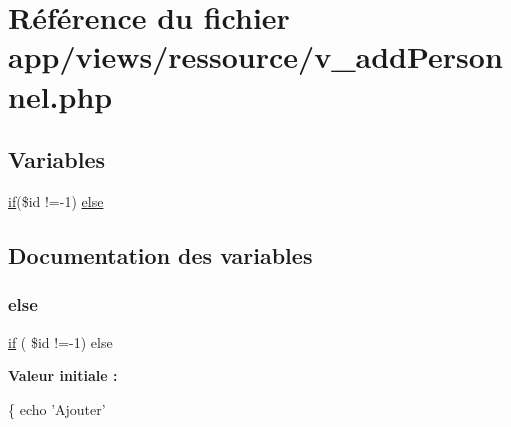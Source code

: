\hypertarget{v__add_personnel_8php}{}\section{Référence du fichier app/views/ressource/v\+\_\+add\+Personnel.php}
\label{v__add_personnel_8php}
\subsection*{Variables}
\begin{DoxyCompactItemize}
\item 
\hyperlink{_v__menu_8php_ac81b1d41ce3949361fdb64fac6891d95}{if}(\$id !=-\/1) \hyperlink{v__add_personnel_8php_aa2a7181caf9a13ae97bce535bcd061d2}{else}
\end{DoxyCompactItemize}


\subsection{Documentation des variables}
\mbox{\label{v__add_personnel_8php_aa2a7181caf9a13ae97bce535bcd061d2}} 
\subsubsection{\texorpdfstring{else}{else}}
{\footnotesize\ttfamily \hyperlink{_v__menu_8php_ac81b1d41ce3949361fdb64fac6891d95}{if} ( \$id !=-\/1) else}

{\bfseries Valeur initiale \+:}
\begin{DoxyCode}
\{
    echo \textcolor{stringliteral}{'Ajouter'}
\end{DoxyCode}
